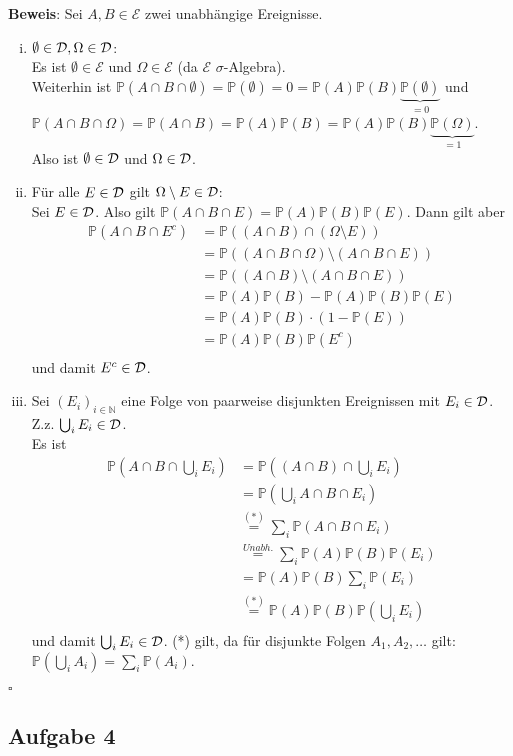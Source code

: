 \documentclass[11pt,a4paper,ngerman]{article}
\newcommand{\Prob}{\mathbb{P}}
\newcommand{\Epsilon}{\mathcal{E}}
\begin{document}
\textbf{Beweis}: Sei  $A,B \in \Epsilon$ zwei unabhängige Ereignisse.
\begin{enumerate}[(i)]
\item $\emptyset \in \mathcal{D}, \Omega \in \mathcal{D}$: \\
Es ist $\emptyset \in \Epsilon$ und $\Omega \in \Epsilon$ (da $\Epsilon$ $\sigma$-Algebra). \\
Weiterhin ist $\Prob(A \cap B \cap \emptyset) = \Prob(\emptyset) = 0 = \Prob(A) \Prob(B) \underbrace{\Prob(\emptyset)}_{=0}$ und \\
$\Prob(A \cap B \cap \Omega) = \Prob(A \cap B) = \Prob(A) \Prob(B) =  \Prob(A) \Prob(B) \underbrace{\Prob(\Omega)}_{=1}$. \\
Also ist $\emptyset \in \mathcal{D}$ und $\Omega \in \mathcal{D}$.
\item Für alle $E \in \mathcal{D}$ gilt  $\Omega \setminus E \in \mathcal{D}$: \\
Sei $E \in \mathcal{D}$. Also gilt $\Prob(A \cap B \cap E) = \Prob(A) \Prob(B) \Prob(E)$. Dann gilt aber
\begin{equation*}\begin{split}
 \Prob(A \cap B \cap E^c) &=  \Prob((A \cap B) \cap (\Omega \setminus E)) \\
&=  \Prob((A \cap B \cap \Omega) \setminus (A \cap B \cap E)) \\
&= \Prob((A \cap B) \setminus (A \cap B \cap E)) \\
&=  \Prob(A)\Prob(B) - \Prob(A)\Prob(B)\Prob(E) \\
&= \Prob(A)\Prob(B) \cdot (1 - \Prob(E)) \\
&= \Prob(A)\Prob(B) \Prob(E^c) \\
\end{split}\end{equation*}
und damit $E^c \in \mathcal{D}$.
\item Sei $\left( E_i \right)_{i \in \mathbb{N}}$ eine Folge von paarweise disjunkten Ereignissen mit $E_i \in \mathcal{D}$. \\
Z.z. $\bigcup_i E_i \in \mathcal{D}$. \\
Es ist
\begin{equation*}\begin{split}
 \Prob(A \cap B \cap \bigcup_i E_i) &=  \Prob((A \cap B) \cap \bigcup_i E_i) \\
&= \Prob(\bigcup_i A \cap B \cap E_i) \\
&\stackrel{(*)}{=} \sum_i \Prob(A \cap B \cap E_i) \\
&\stackrel{Unabh.}{=} \sum_i \Prob(A) \Prob(B) \Prob(E_i) \\
&= \Prob(A)\Prob(B) \sum_i \Prob(E_i) \\
&\stackrel{(*)}{=} \Prob(A)\Prob(B) \Prob(\bigcup_i E_i) \\
\end{split}\end{equation*}
und damit $\bigcup_i E_i \in \mathcal{D}$.
(*) gilt, da für disjunkte Folgen $A_1, A_2, \ldots$ gilt: $\Prob(\bigcup_i A_i) = \sum_i \Prob(A_i)$.
\end{enumerate}
\mbox{} \hfill $\square$
\subsection*{Aufgabe 4}


\label{LastPage}
\end{document}
